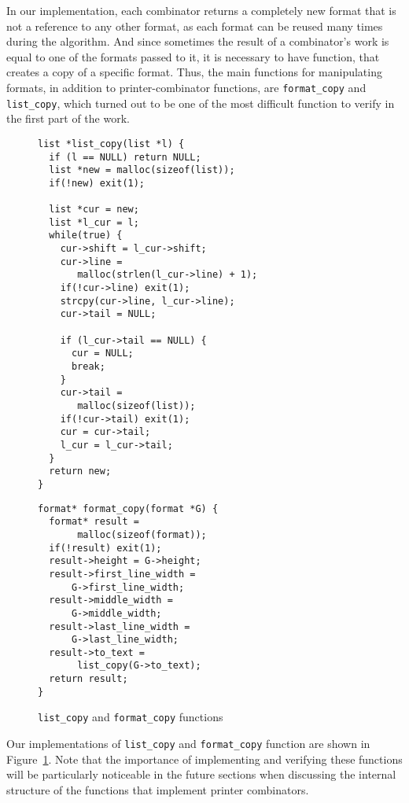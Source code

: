 \documentclass[14pt]{constructor-diploma}
\begin{document}
In our implementation, each combinator returns a completely new format that is not a reference to any other format, 
as each format can be reused many times during the algorithm. And since sometimes the result of a combinator's work 
is equal to one of the formats passed to it, it is necessary to have function, that creates a copy of a specific format. 
Thus, the main functions for manipulating formats, in addition to printer-combinator functions, are
\texttt{format\_copy} and \texttt{list\_copy}, which turned out to be one of the most difficult function to verify in the first part of the work.
\begin{figure}[H]
\begin{minipage}{0.55\textwidth}

\begin{mdframed}[backgroundcolor=bg]
\begin{verbatim}
list *list_copy(list *l) {
  if (l == NULL) return NULL;
  list *new = malloc(sizeof(list));
  if(!new) exit(1);

  list *cur = new;
  list *l_cur = l;
  while(true) {
    cur->shift = l_cur->shift;
    cur->line =
       malloc(strlen(l_cur->line) + 1);
    if(!cur->line) exit(1);
    strcpy(cur->line, l_cur->line);
    cur->tail = NULL;

    if (l_cur->tail == NULL) {
      cur = NULL;
      break;
    }
    cur->tail =
       malloc(sizeof(list));
    if(!cur->tail) exit(1);
    cur = cur->tail;
    l_cur = l_cur->tail;
  }
  return new;
}
\end{verbatim}
\end{mdframed}
\vspace*{-210pt}
\end{minipage}
\begin{minipage}{0.46\textwidth}

\begin{mdframed}[backgroundcolor=bg]
\begin{verbatim}
format* format_copy(format *G) {
  format* result =
       malloc(sizeof(format));
  if(!result) exit(1);
  result->height = G->height;
  result->first_line_width = 
      G->first_line_width;
  result->middle_width = 
      G->middle_width;
  result->last_line_width = 
      G->last_line_width;
  result->to_text =
       list_copy(G->to_text);
  return result;
}
\end{verbatim}
\end{mdframed}
\end{minipage}
\vspace*{210pt}
\caption{\texttt{list\_copy} and \texttt{format\_copy} functions}
\label{fig:format_copy}
\end{figure}
Our implementations of \texttt{list\_copy} and \texttt{format\_copy} function are shown in Figure~\ref{fig:format_copy}.
Note that the importance of implementing and verifying these functions will be particularly noticeable in the future sections
when discussing the internal structure of the functions that implement printer combinators.
\end{document}
